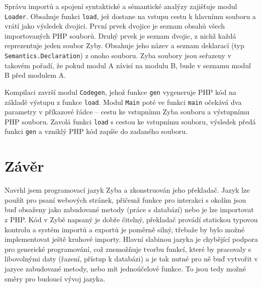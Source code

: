 \documentclass[a4paper,12pt]{article}
\begin{document}
Správu importů a spojení syntaktické a sémantické analýzy zajišťuje modul \texttt{Loader}. Obsahuje funkci \texttt{load}, jež dostane na vstupu cestu k hlavnímu souboru a vrátí jako výsledek dvojici. První prvek dvojice je seznam obsahů všech importovaných PHP souborů. Druhý prvek je seznam dvojic, z nichž každá reprezentuje jeden soubor Zyby. Obsahuje jeho název a seznam deklarací (typ \texttt{Semantics.Declaration}) z onoho souboru. Zyba soubory jsou seřazeny v takovém pořadí, že pokud modul A závisí na modulu B, bude v seznamu modul B před modulem A.

Kompilaci završí modul \texttt{Codegen}, jehož funkce \texttt{gen} vygeneruje PHP kód na základě výstupu z funkce \texttt{load}. Modul \texttt{Main} poté ve funkci \texttt{main} očekává dva parametry v příkazové řádce -- cestu ke vstupnímu Zyba souboru a výstupnímu PHP souboru. Zavolá funkci \texttt{load} s cestou ke vstupnímu souboru, výsledek předá funkci \texttt{gen} a vzniklý PHP kód zapíše do zadaného souboru.

\section{Závěr}
Navrhl jsem programovací jazyk Zyba a zkonstruován jeho překladač. Jazyk lze použít pro psaní webových stránek, přičemž funkce pro interakci s okolím jsou buď obsaženy jako zabudované metody (práce s databází) nebo je lze importovat z PHP. Kód v Zybě napsaný je dobře čitelný, překladač provádí statickou typovou kontrolu a systém importů a exportů je poměrně silný, třebaže by bylo možné implementovat ještě kruhové importy. Hlavní slabinou jazyka je chybějící podpora pro generické programování, což znemožňuje tvorbu funkcí, které by pracovaly s libovolnými daty (řazení, přístup k databázi) a je tak nutné pro ně buď vytvořit v jazyce zabudované metody, nebo mít jednoúčelové funkce. To jsou tedy možné směry pro budoucí vývoj jazyka.

\newpage
\printbibliography[heading=bibintoc, title={Použitá literatura}]
\newpage
\end{document}
